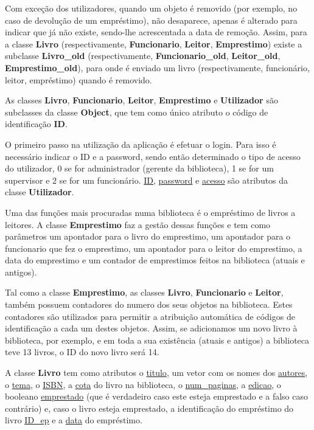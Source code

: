 \documentclass[12pt,a4paper,reqno]{report}
\numberwithin{figure}{section}
\numberwithin{equation}{section}
\begin{document}
Com exceção dos utilizadores, quando um objeto é removido (por exemplo, no caso de devolução de um empréstimo), não desaparece, apenas é alterado para indicar que já não existe, sendo-lhe acrescentada a data de remoção. Assim, para a classe \textbf{Livro} (respectivamente, \textbf{Funcionario}, \textbf{Leitor}, \textbf{Emprestimo}) existe a subclasse \textbf{Livro\_old} (respectivamente, \textbf{Funcionario\_old}, \textbf{Leitor\_old}, \textbf{Emprestimo\_old}), para onde é enviado um livro (respectivamente, funcionário, leitor, empréstimo) quando é removido.

As classes \textbf{Livro}, \textbf{Funcionario}, \textbf{Leitor}, \textbf{Emprestimo} e \textbf{Utilizador} são subclasses da classe \textbf{Object}, que tem como único atributo o código de identificação \textbf{ID}.

O primeiro passo na utilização da aplicação é efetuar o login. Para isso é necessário indicar o ID e a password, sendo então determinado o tipo de acesso do utilizador, 0 se for administrador (gerente da biblioteca), 1 se for um supervisor e 2 se for um funcionário. \underline{ID}, \underline{password} e \underline{acesso} são atributos da classe \textbf{Utilizador}.

Uma das funções mais procuradas numa biblioteca é o empréstimo de livros a leitores. A classe \textbf{Emprestimo} faz a gestão dessas funções e tem como parâmetros um apontador para o livro do emprestimo, um apontador para o funcionario que fez o emprestimo, um apontador para o leitor do emprestimo, a data do emprestimo e um contador de emprestimos feitos na biblioteca (atuais e antigos).

Tal como a classe \textbf{Emprestimo}, as classes \textbf{Livro}, \textbf{Funcionario} e \textbf{Leitor}, também possuem contadores do numero dos seus objetos na biblioteca. Estes contadores são utilizados para permitir a atribuição automática de códigos de identificação a cada um destes objetos. Assim, se adicionamos um novo livro à biblioteca, por exemplo, e em toda a sua existência (atuais e antigos) a biblioteca teve 13 livros, o ID do novo livro será 14.

A classe \textbf{Livro} tem como atributos o \underline{titulo}, um vetor com os nomes dos \underline{autores}, o \underline{tema}, o \underline{ISBN}, a \underline{cota} do livro na biblioteca, o \underline{num\_paginas}, a \underline{edicao}, o booleano \underline{emprestado} (que é verdadeiro caso este esteja emprestado e a falso caso contrário) e, caso o livro esteja emprestado, a identificação do empréstimo do livro \underline{ID\_ep} e a \underline{data} do empréstimo.
\end{document}
